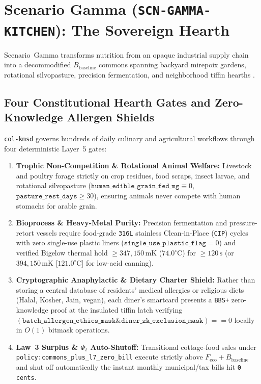 \section{Scenario Gamma (\texttt{SCN-GAMMA-KITCHEN}): The Sovereign Hearth}
\label{sec:waveb-gamma}

Scenario~Gamma transforms nutrition from an opaque industrial supply chain into a decommodified
$B_{\mathrm{baseline}}$ commons spanning backyard mirepoix gardens, rotational silvopasture,
precision fermentation, and neighborhood tiffin hearths \parencite{bigelow1921thermal}.

\subsection{Four Constitutional Hearth Gates and Zero-Knowledge Allergen Shields}

\texttt{col-kmsd} governs hundreds of daily culinary and agricultural workflows through four
deterministic Layer~5 gates:
\begin{enumerate}
    \item \textbf{Trophic Non-Competition \& Rotational Animal Welfare:} Livestock and poultry
    forage strictly on crop residues, food scraps, insect larvae, and rotational silvopasture
    ($\mathtt{human\_edible\_grain\_fed\_mg} \equiv 0$, $\mathtt{pasture\_rest\_days} \ge 30$),
    ensuring animals never compete with human stomachs for arable grain.
    \item \textbf{Bioprocess \& Heavy-Metal Purity:} Precision fermentation and pressure-retort
    vessels require food-grade \texttt{316L} stainless Clean-in-Place (\texttt{CIP}) cycles with
    zero single-use plastic liners ($\mathtt{single\_use\_plastic\_flag} = 0$) and verified Bigelow
    thermal hold $\ge 347{,}150\,\mathrm{mK}$ ($74.0^\circ\mathrm{C}$) for $\ge 120\,\mathrm{s}$
    (or $394{,}150\,\mathrm{mK}$ [$121.0^\circ\mathrm{C}$] for low-acid canning).
    \item \textbf{Cryptographic Anaphylactic \& Dietary Charter Shield:} Rather than storing a
    central database of residents' medical allergies or religious diets (Halal, Kosher, Jain, vegan),
    each diner's smartcard presents a \texttt{BBS+} zero-knowledge proof \parencite{camenisch2004signature}
    at the insulated tiffin latch verifying $(\mathtt{batch\_allergen\_ethics\_mask} \mathbin{\&}
    \mathtt{diner\_zk\_exclusion\_mask}) == 0$ locally in $O(1)$ bitmask operations.
    \item \textbf{Law~3 Surplus \& $\Phi_t$ Auto-Shutoff:} Transitional cottage-food sales under
    \texttt{policy:commons\_plus\_l7\_zero\_bill} execute strictly above $F_{\mathrm{eco}} + B_{\mathrm{baseline}}$
    and shut off automatically the instant monthly municipal/tax bills hit \texttt{0 cents}.
\end{enumerate}


